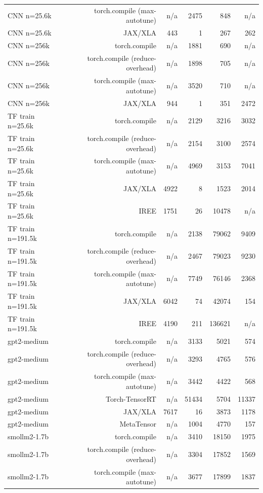 \begin{tabular}{lrrrrr}
CNN n=25.6k & torch.compile (max-autotune) & n/a & 2475 & 848 & n/a \\
CNN n=25.6k & JAX/XLA & 443 & 1 & 267 & 262 \\
CNN n=256k & torch.compile & n/a & 1881 & 690 & n/a \\
CNN n=256k & torch.compile (reduce-overhead) & n/a & 1898 & 705 & n/a \\
CNN n=256k & torch.compile (max-autotune) & n/a & 3520 & 710 & n/a \\
CNN n=256k & JAX/XLA & 944 & 1 & 351 & 2472 \\
TF train n=25.6k & torch.compile & n/a & 2129 & 3216 & 3032 \\
TF train n=25.6k & torch.compile (reduce-overhead) & n/a & 2154 & 3100 & 2574 \\
TF train n=25.6k & torch.compile (max-autotune) & n/a & 4969 & 3153 & 7041 \\
TF train n=25.6k & JAX/XLA & 4922 & 8 & 1523 & 2014 \\
TF train n=25.6k & IREE & 1751 & 26 & 10478 & n/a \\
TF train n=191.5k & torch.compile & n/a & 2138 & 79062 & 9409 \\
TF train n=191.5k & torch.compile (reduce-overhead) & n/a & 2467 & 79023 & 9230 \\
TF train n=191.5k & torch.compile (max-autotune) & n/a & 7749 & 76146 & 2368 \\
TF train n=191.5k & JAX/XLA & 6042 & 74 & 42074 & 154 \\
TF train n=191.5k & IREE & 4190 & 211 & 136621 & n/a \\
gpt2-medium & torch.compile & n/a & 3133 & 5021 & 574 \\
gpt2-medium & torch.compile (reduce-overhead) & n/a & 3293 & 4765 & 576 \\
gpt2-medium & torch.compile (max-autotune) & n/a & 3442 & 4422 & 568 \\
gpt2-medium & Torch-TensorRT & n/a & 51434 & 5704 & 11337 \\
gpt2-medium & JAX/XLA & 7617 & 16 & 3873 & 1178 \\
gpt2-medium & MetaTensor & n/a & 1004 & 4770 & 157 \\
smollm2-1.7b & torch.compile & n/a & 3410 & 18150 & 1975 \\
smollm2-1.7b & torch.compile (reduce-overhead) & n/a & 3304 & 17852 & 1569 \\
smollm2-1.7b & torch.compile (max-autotune) & n/a & 3677 & 17899 & 1837 \\

\end{tabular}
